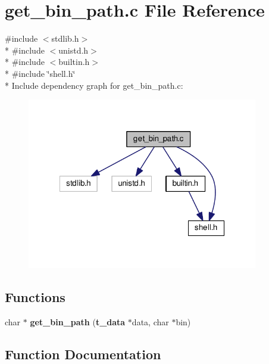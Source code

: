 \section{get\-\_\-bin\-\_\-path.\-c File Reference}
\label{get__bin__path_8c}
{\ttfamily \#include $<$stdlib.\-h$>$}\\*
{\ttfamily \#include $<$unistd.\-h$>$}\\*
{\ttfamily \#include $<$builtin.\-h$>$}\\*
{\ttfamily \#include \char`\"{}shell.\-h\char`\"{}}\\*
Include dependency graph for get\-\_\-bin\-\_\-path.\-c\-:
\nopagebreak
\begin{figure}[H]
\begin{center}
\leavevmode
\includegraphics[width=286pt]{get__bin__path_8c__incl}
\end{center}
\end{figure}
\subsection*{Functions}
\begin{DoxyCompactItemize}
\item 
char $\ast$ {\bf get\-\_\-bin\-\_\-path} ({\bf t\-\_\-data} $\ast$data, char $\ast$bin)
\end{DoxyCompactItemize}


\subsection{Function Documentation}
